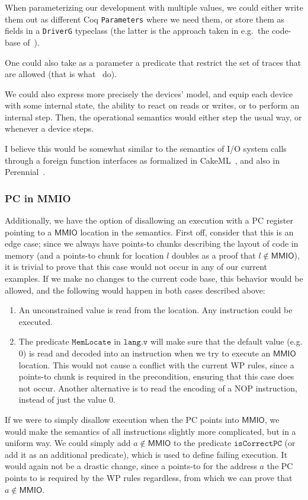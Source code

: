 \documentclass{article}
\newcommand{\X}[1]{\ensuremath{\mathrm{#1}}}
\newcommand{\I}[1]{\ensuremath{\mathtt{#1}}}
\newcommand{\Sf}[1]{\ensuremath{\mathsf{#1}}}
\newcommand{\MMIO}{\Sf{MMIO}\xspace}
\begin{document}
When parameterizing our development with multiple values, we could either write
them out as different Coq \texttt{Parameters} where we need them, or store them
as fields in a \texttt{DriverG} typeclass (the latter is the approach taken in
e.g.\ the code-base of~\cite{sammler-2020}).

One could also take as a parameter a predicate that restrict the set of traces
that are allowed (that is what~\cite{sammler-2020} do).

We could also express more precisely the devices' model, and equip each device
with some internal state, the ability to react on reads or writes, or to perform
an internal step. Then, the operational semantics would either step the usual
way, or whenever a device steps.

I believe this would be somewhat similar to the semantics of I/O system calls
through a foreign function interfaces as formalized in
CakeML~\cite{cakeml-vstte17io}, and also in Perennial~\cite{perennial-lang}.


\subsubsection{PC in MMIO}
\label{rk:opsem:pc_in_mmio}

Additionally, we have the option of disallowing an execution with a \X{PC}
register pointing to a $\MMIO$ location in the semantics.
%
First off, consider that this is an edge case; since we always have points-to
chunks describing the layout of code in memory (and a points-to chunk for
location $l$ doubles as a proof that $l \not\in \MMIO$), it is trivial to prove
that this case would not occur in any of our current examples.
%
If we make no changes to the current code base, this behavior would be allowed,
and the following would happen in both cases described above:
%
\begin{enumerate}
  \item An unconstrained value is read from the location. Any instruction could
    be executed.
%
  \item The predicate $\I{MemLocate}$ in $\I{lang.v}$ will make sure that the
    default value (e.g. $0$) is read and decoded into an instruction when we try
    to execute an \MMIO location. This would not cause a conflict with the
    current WP rules, since a points-to chunk is required in the precondition,
    ensuring that this case does not occur.
    Another alternative is to read the encoding of a $\X{NOP}$ instruction,
    instead of just the value $0$.
\end{enumerate}
%
If we were to simply disallow execution when the PC points into \MMIO, we would
make the semantics of all instructions slightly more complicated, but in a
uniform way.
%
We could simply add $a \not\in \MMIO$ to the predicate $\I{isCorrectPC}$ (or add
it as an additional predicate), which is used to define failing execution. It
would again not be a drastic change, since a points-to for the address $a$ the
PC points to is required by the WP rules regardless, from which we can prove
that $a \not\in \MMIO$.
\end{document}
